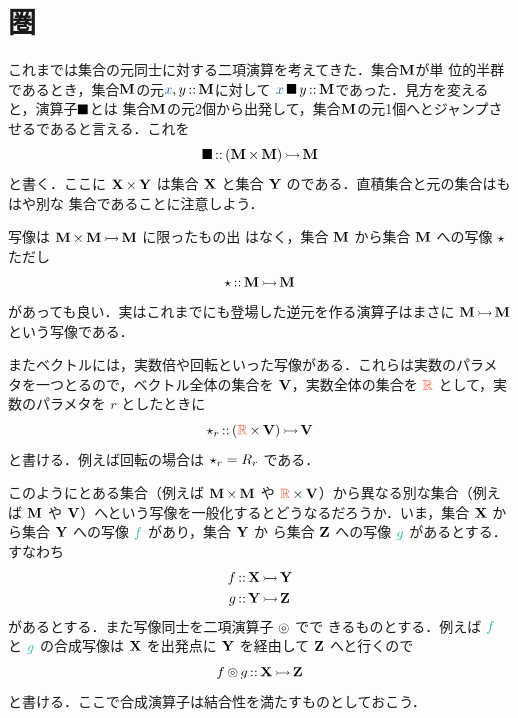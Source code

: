 \documentclass[a5paper,twoside,fleqn,draft]{jsbook}
\begin{document}
\section{圏}

これまでは集合の元同士に対する二項演算を考えてきた．集合$\mathbf{M}$が単
位的半群であるとき，集合$\mathbf{M}$の元$\hVar{x},y\hIsTypeOf\mSet{M}$に対して
$\hVar{x}\hAnyBinOp y\hIsTypeOf\mSet{M}$であった．見方を変えると，演算子$\operatorname{\blacksquare}$とは
集合$\mathbf{M}$の元2個から出発して，集合$\mathbf{M}$の元1個へとジャンプさ
せるであると言える．これを
\begin{equation}
\operatorname{\blacksquare}\operatorname{:\!:}{}(\mathbf{M}\operatorname{\bf{\times}}\mathbf{M})\operatorname{\rightarrowtail}\mathbf{M}
\end{equation}
と書く．ここに $\mathbf{X}\operatorname{\bf{\times}}\mathbf{Y}$ は集合 $\mathbf{X}$ と集合
$\mathbf{Y}$ のである．直積集合と元の集合はもはや別な
集合であることに注意しよう．

写像は $\mathbf{M}\operatorname{\bf{\times}}\mathbf{M}\operatorname{\rightarrowtail}\mathbf{M}$ に限ったもの出
はなく，集合 $\mathbf{M}$ から集合 $\mathbf{M}$ への写像 $\operatorname{\star}$ ただし
\begin{equation}
\operatorname{\star}\operatorname{:\!:}\mathbf{M}\operatorname{\rightarrowtail}\mathbf{M}
\end{equation}
があっても良い．実はこれまでにも登場した逆元を作る演算子はまさに
$\mathbf{M}\operatorname{\rightarrowtail}\mathbf{M}$ という写像である．

またベクトルには，実数倍や回転といった写像がある．これらは実数のパラメ
タを一つとるので，ベクトル全体の集合を $\mathbf{V}$，実数全体の集合を
$\mRSet$ として，実数のパラメタを $r$ としたときに
\begin{equation}
\mUnOp_r\hIsTypeOf{}\mMorph{(\mRSet\mSetTimes\mSet{V})}{\mSet{V}}
\end{equation}
と書ける．例えば回転の場合は $\operatorname{\star}_r=R_r$ である．

このようにとある集合（例えば $\mathbf{M}\operatorname{\bf{\times}}\mathbf{M}$ や
$\mRSet\mSetTimes\mSet{V}$）から異なる別な集合（例えば $\mathbf{M}$ や
$\mathbf{V}$）へという写像を一般化するとどうなるだろうか．いま，集合
$\mathbf{X}$ から集合 $\mathbf{Y}$ への写像 $\hFunc{f}$ があり，集合 $\mathbf{Y}$ か
ら集合 $\mathbf{Z}$ への写像 $\hFunc{g}$ があるとする．すなわち
\begin{align}
f&\operatorname{:\!:}\mathbf{X}\operatorname{\rightarrowtail}\mathbf{Y}\\
g&\operatorname{:\!:}\mathbf{Y}\operatorname{\rightarrowtail}\mathbf{Z}
\end{align}
があるとする．また写像同士を二項演算子 $\operatorname{\circledcirc}$ でで
きるものとする．例えば $\hFunc{f}$ と $\hFunc{g}$ の合成写像は $\mathbf{X}$ を出発点に
$\mathbf{Y}$ を経由して $\mathbf{Z}$ へと行くので
\begin{equation}
f\operatorname{\circledcirc} g\operatorname{:\!:}\mathbf{X}\operatorname{\rightarrowtail}\mathbf{Z}
\end{equation}
と書ける．ここで合成演算子は結合性を満たすものとしておこう．
\end{document}
